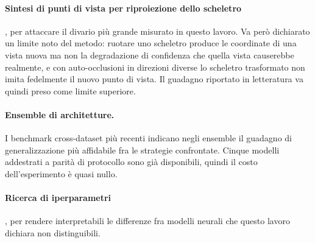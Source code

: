 \paragraph{Sintesi di punti di vista per riproiezione dello scheletro}, per attaccare il divario più grande misurato in questo lavoro. Va però dichiarato un limite noto del metodo: ruotare uno scheletro produce le coordinate di una vista nuova ma non la degradazione di confidenza che quella vista causerebbe realmente, e con auto-occlusioni in direzioni diverse lo scheletro trasformato non imita fedelmente il nuovo punto di vista. Il guadagno riportato in letteratura va quindi preso come limite superiore.

\paragraph{Ensemble di architetture.} I benchmark cross-dataset più recenti indicano negli ensemble il guadagno di generalizzazione più affidabile fra le strategie confrontate. Cinque modelli addestrati a parità di protocollo sono già disponibili, quindi il costo dell'esperimento è quasi nullo.

\paragraph{Ricerca di iperparametri}, per rendere interpretabili le differenze fra modelli neurali che questo lavoro dichiara non distinguibili.


